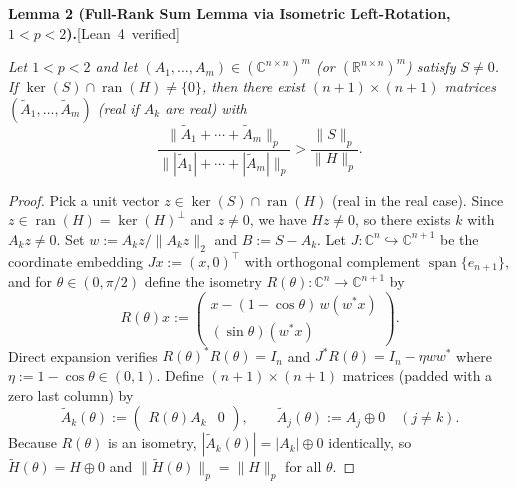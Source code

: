 \documentclass[10pt,letterpaper]{article}
\newcommand{\leanbadge}[1]{\mbox{\sffamily\scriptsize\color{leanborder}[#1]}}
\newcommand{\C}{\mathbb{C}}
\newcommand{\R}{\mathbb{R}}
\newcommand{\ran}{\operatorname{ran}}
\begin{document}
\begin{tcolorbox}[lemmabox]
\textbf{Lemma 2 (Full-Rank Sum Lemma via Isometric Left-Rotation, $1 < p < 2$).}\hfill\leanbadge{Lean~4 verified}\par\vspace{1.5pt}
\emph{Let $1 < p < 2$ and let $(A_1,\dots,A_m) \in (\C^{n\times n})^m$ (or $(\R^{n\times n})^m$) satisfy $S \neq 0$. If $\ker(S) \cap \ran(H) \neq \{0\}$, then there exist $(n+1)\times(n+1)$ matrices $(\widetilde{A}_1,\dots,\widetilde{A}_m)$ (real if $A_k$ are real) with}
\[
  \frac{\|\widetilde{A}_1 + \cdots + \widetilde{A}_m\|_p}{\||\widetilde{A}_1| + \cdots + |\widetilde{A}_m|\|_p} > \frac{\|S\|_p}{\|H\|_p}.
\]
\end{tcolorbox}

\begin{proof}
Pick a unit vector $z \in \ker(S) \cap \ran(H)$ (real in the real case). Since $z \in \ran(H) = \ker(H)^\perp$ and $z \neq 0$, we have $Hz \neq 0$, so there exists $k$ with $A_k z \neq 0$. Set $w := A_k z / \|A_k z\|_2$ and $B := S - A_k$. Let $J : \C^n \hookrightarrow \C^{n+1}$ be the coordinate embedding $Jx := (x, 0)^\top$ with orthogonal complement $\operatorname{span}\{e_{n+1}\}$, and for $\theta \in (0, \pi/2)$ define the isometry $R(\theta) : \C^n \to \C^{n+1}$ by
\[
  R(\theta)x := \begin{pmatrix} x - (1 - \cos\theta)\,w(w^* x) \\ (\sin\theta)(w^* x) \end{pmatrix}.
\]
Direct expansion verifies $R(\theta)^* R(\theta) = I_n$ and $J^* R(\theta) = I_n - \eta w w^*$ where $\eta := 1 - \cos\theta \in (0,1)$. Define $(n+1)\times(n+1)$ matrices (padded with a zero last column) by
\[
  \widetilde{A}_k(\theta) := \begin{pmatrix} R(\theta) A_k & 0 \end{pmatrix}, \qquad
  \widetilde{A}_j(\theta) := A_j \oplus 0 \quad (j \neq k).
\]
Because $R(\theta)$ is an isometry, $|\widetilde{A}_k(\theta)| = |A_k| \oplus 0$ identically, so $\widetilde{H}(\theta) = H \oplus 0$ and $\|\widetilde{H}(\theta)\|_p = \|H\|_p$ for all $\theta$.


\end{proof}
\end{document}
